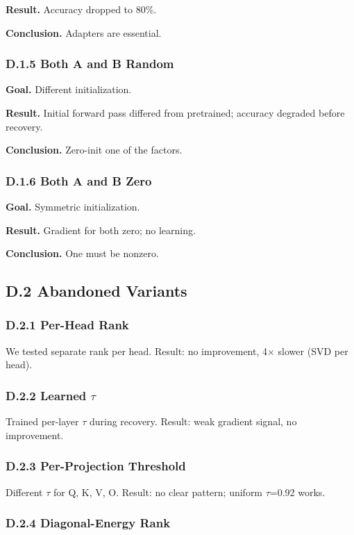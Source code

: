 \textbf{Result.} Accuracy dropped to 80\%.

\textbf{Conclusion.} Adapters are essential.

\subsubsection{D.1.5 Both A and B Random}

\textbf{Goal.} Different initialization.

\textbf{Result.} Initial forward pass differed from pretrained; accuracy 
degraded before recovery.

\textbf{Conclusion.} Zero-init one of the factors.

\subsubsection{D.1.6 Both A and B Zero}

\textbf{Goal.} Symmetric initialization.

\textbf{Result.} Gradient for both zero; no learning.

\textbf{Conclusion.} One must be nonzero.

\subsection{D.2 Abandoned Variants}

\subsubsection{D.2.1 Per-Head Rank}

We tested separate rank per head. Result: no improvement, 4$\times$ slower 
(SVD per head).

\subsubsection{D.2.2 Learned $\tau$}

Trained per-layer $\tau$ during recovery. Result: weak gradient signal, no 
improvement.

\subsubsection{D.2.3 Per-Projection Threshold}

Different $\tau$ for Q, K, V, O. Result: no clear pattern; uniform $\tau$=0.92 
works.

\subsubsection{D.2.4 Diagonal-Energy Rank}

